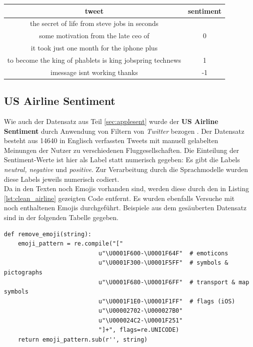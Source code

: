 \begin{center}
\begin{tabular}{|c|c|}
\hline
tweet & sentiment\\ 
\hline\hline
the secret of life from steve jobs in    seconds& \\ some motivation from the late ceo of&0\\
\hline
it took just one month for the iphone plus& \\to become the king of phablets  is king  jobspring technews&1\\
\hline
imessage isnt working thanks&-1\\
\hline    
\end{tabular}
\end{center}


\subsection{US Airline Sentiment}
\label{sec:airlinesent}
Wie auch der Datensatz aus Teil \ref{sec:applesent} wurde der \textbf{US Airline Sentiment} durch Anwendung von Filtern von \textit{Twitter} bezogen \cite{airlines}. Der Datensatz besteht aus 14640 in Englisch verfassten Tweets mit manuell gelabelten Meinungen der Nutzer zu verschiedenen Fluggesellschaften. Die Einteilung der Sentiment-Werte ist hier als Label statt numerisch gegeben: Es gibt die Labels \textit{neutral, negative} und \textit{positive}. Zur Verarbeitung durch die Sprachmodelle wurden diese Labels jeweils numerisch codiert.\\
Da in den Texten noch Emojis vorhanden sind, werden diese durch den in Listing \ref{lst:clean_airline} gezeigten Code entfernt. Es wurden ebenfalls Versuche mit noch enthaltenen Emojis durchgef\"uhrt. Beispiele aus dem ges\"auberten Datensatz sind in der folgenden Tabelle gegeben.
\lstset{language=Python}
\lstset{frame=lines}
\lstset{captionpos=b}
\lstset{basicstyle=\footnotesize}
\begin{lstlisting}
def remove_emoji(string):
    emoji_pattern = re.compile("["
                           u"\U0001F600-\U0001F64F"  # emoticons
                           u"\U0001F300-\U0001F5FF"  # symbols & pictographs
                           u"\U0001F680-\U0001F6FF"  # transport & map symbols
                           u"\U0001F1E0-\U0001F1FF"  # flags (iOS)
                           u"\U00002702-\U000027B0"
                           u"\U000024C2-\U0001F251"
                           "]+", flags=re.UNICODE)
    return emoji_pattern.sub(r'', string)
\end{lstlisting}
